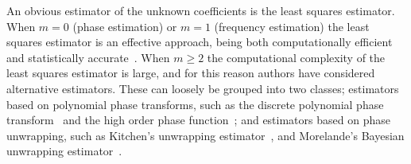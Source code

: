 \documentclass[aap]{imsart}
\begin{document}
%

An obvious estimator of the unknown coefficients is the least squares estimator.  
When $m=0$ (phase estimation) or $m=1$ (frequency estimation) the least squares estimator is an effective approach, being both computationally efficient and statistically accurate~\cite{Hannan1973,Quinn2001,McKilliam_mean_dir_est_sq_arc_length2010}. When $m \geq 2$ the computational complexity of the least squares estimator is large, and for this reason authors have considered alternative estimators. These can loosely be grouped into two classes; estimators based on polynomial phase transforms, such as the discrete polynomial phase transform~\cite{Peleg_DPT_1995,Porat_asympt_HAF_DPT_1996} and the high order phase function~\cite{Farquharson_another_poly_est_2005}; and estimators based on phase unwrapping, such as Kitchen's unwrapping estimator~\cite{Kitchen_polyphase_unwrapping_1994}, and Morelande's Bayesian unwrapping estimator~\cite{Morelande_bayes_unwrapping_2009_tsp}.
\end{document}
